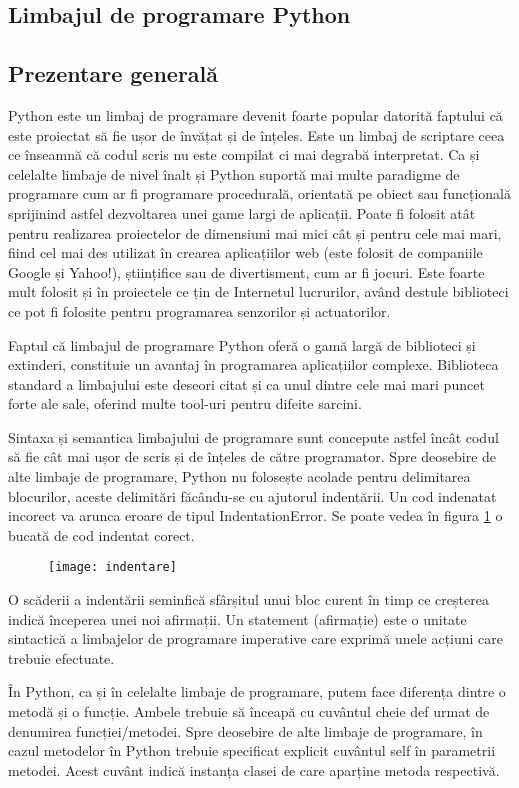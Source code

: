 \documentclass[../IoMusT.tex]{subfiles}
\begin{document}
\subsection{Limbajul de programare Python}
\subsection{Prezentare generală}
Python este un limbaj de programare devenit foarte popular datorită faptului că este proiectat să fie ușor de învățat și de înțeles. Este un limbaj de scriptare ceea ce înseamnă că codul scris nu este compilat ci mai degrabă interpretat. Ca și celelalte limbaje de nivel înalt și Python suportă mai multe paradigme de programare cum ar fi programare procedurală, orientată pe obiect sau funcțională sprijinind astfel dezvoltarea unei game largi de aplicații. Poate fi folosit atât pentru realizarea proiectelor de dimensiuni mai mici cât și pentru cele mai mari, fiind cel mai des utilizat în crearea aplicațiilor web (este folosit de companiile Google și Yahoo!), științifice sau de divertisment, cum ar fi jocuri. Este foarte mult folosit și în proiectele ce țin de Internetul lucrurilor, având destule biblioteci ce pot fi folosite pentru programarea senzorilor și actuatorilor.
\\
\par Faptul că limbajul de programare Python oferă o gamă largă de biblioteci și extinderi, constituie un avantaj în programarea aplicațiilor complexe. Biblioteca standard a limbajului este deseori citat și ca unul dintre cele mai mari puncet forte ale sale, oferind multe tool-uri pentru difeite sarcini.
\\
\par Sintaxa și semantica limbajului de programare sunt concepute astfel încât codul să fie cât mai ușor de scris și de înțeles de către programator. Spre deosebire de alte limbaje de programare, Python nu folosește acolade pentru delimitarea blocurilor, aceste delimitări făcându-se cu ajutorul indentării. Un cod indenatat incorect va arunca eroare de tipul IndentationError. Se poate vedea în figura \ref{fig:indent} o bucată de cod indentat corect.
\begin{figure}[h]
\centering
\texttt{[image: indentare]}
\caption{}
\label{fig:indent}
\end{figure}
O scăderii  a indentării  seminfică sfârșitul unui bloc curent în timp ce creșterea indică începerea unei noi afirmații. Un statement (afirmație) este o unitate sintactică a limbajelor de programare imperative care exprimă  unele acțiuni care trebuie efectuate.
\\
\par În Python, ca și în celelalte limbaje de programare, putem face diferența dintre o metodă și o funcție. Ambele trebuie să înceapă cu cuvântul cheie def urmat de denumirea funcției/metodei. Spre deosebire de alte limbaje de programare, în cazul metodelor în Python trebuie specificat explicit cuvântul self în parametrii metodei. Acest cuvânt indică instanța clasei de care aparține metoda respectivă.
\end{document}
